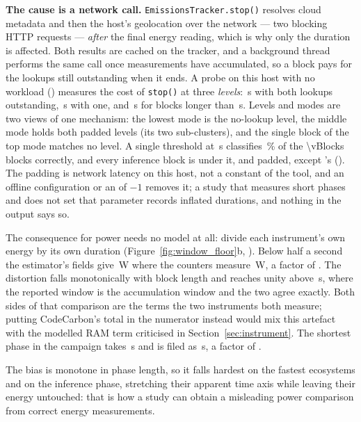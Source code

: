\textbf{The cause is a network call.} \texttt{EmissionsTracker.stop()} resolves
cloud metadata and then the host's geolocation over the network --- two blocking
HTTP requests --- \emph{after} the final energy reading, which is why only the
duration is affected. Both results are cached on the tracker, and a background
thread performs the same call once \vMechApiCallInterval{} measurements have
accumulated, so a block pays for the lookups still outstanding when it ends. A
probe on this host with no workload () measures the cost
of \texttt{stop()} at three \emph{levels}: \vMechBothS\,\si{\second} with both
lookups outstanding, \vMechOneS\,\si{\second} with one, and
\vMechNoneS\,\si{\second} for blocks longer than \vMechThresholdS\,\si{\second}.
Levels and modes are two views of one mechanism: the lowest mode is the
no-lookup level, the middle mode holds both padded levels (its two
sub-clusters), and the single block of the top mode matches no level. A single threshold at
\vWindowThresholdS\,\si{\second} classifies \vThresholdAccuracyPct\,\% of the
\num{\vBlocks} blocks correctly, and every inference block is under it, and padded,
except \vWindowUnpaddedEco{}'s (). The padding is network
latency on this host, not a constant of the tool, and an offline configuration
or an  of $-1$ removes it; a study that measures short
phases and does not set that parameter records inflated durations, and nothing
in the output says so.

The consequence for power needs no model at all: divide each instrument's own
energy by its own duration (Figure~\ref{fig:window_floor}b,
). Below half a second the estimator's fields give
\vPowerReportedWorstW\,W where the counters measure
\vPowerMeasuredWorstW\,W, a factor of \vPowerUnderstatedWorst. The distortion falls monotonically with block length and reaches unity above
\vWindowThresholdS\,\si{\second}, where the reported window is the accumulation window and the two
agree exactly. Both sides of that comparison are the terms the two instruments
both measure; putting CodeCarbon's total in the numerator instead would mix this
artefact with the modelled RAM term criticised in Section~\ref{sec:instrument}.
The
shortest phase in the campaign takes \vShortestPhaseS\,\si{\second} and is filed
as \vShortestPhaseReportedS\,\si{\second}, a factor of \vShortestPhaseFactor.

The bias is monotone in phase length, so it falls hardest on the fastest
ecosystems and on the inference phase, stretching their apparent time axis while
leaving their energy untouched: that is how a study can obtain a misleading
power comparison from correct energy measurements.

